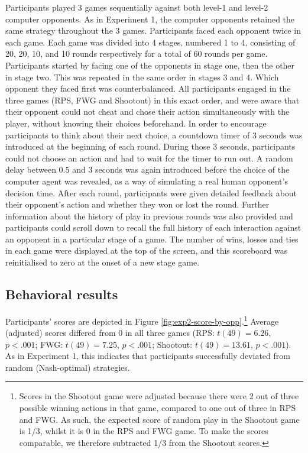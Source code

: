 \documentclass[smallextended]{svjour3}       %
\begin{document}
Participants played 3 games sequentially against both level-1 and
level-2 computer opponents. As in Experiment 1, the computer opponents
retained the same strategy throughout the 3 games. Participants faced
each opponent twice in each game. Each game was divided into 4 stages,
numbered 1 to 4, consisting of 20, 20, 10, and 10 rounds respectively
for a total of 60 rounds per game. Participants started by facing one of
the opponents in stage one, then the other in stage two. This was
repeated in the same order in stages 3 and 4. Which opponent they faced
first was counterbalanced. All participants engaged in the three games
(RPS, FWG and Shootout) in this exact order, and were aware that their
opponent could not cheat and chose their action simultaneously with the
player, without knowing their choices beforehand. In order to encourage
participants to think about their next choice, a countdown timer of 3
seconds was introduced at the beginning of each round. During those 3
seconds, participants could not choose an action and had to wait for the
timer to run out. A random delay between 0.5 and 3 seconds was again
introduced before the choice of the computer agent was revealed, as a
way of simulating a real human opponent's decision time. After each
round, participants were given detailed feedback about their opponent's
action and whether they won or lost the round. Further information about
the history of play in previous rounds was also provided and
participants could scroll down to recall the full history of each
interaction against an opponent in a particular stage of a game. The
number of wins, losses and ties in each game were displayed at the top
of the screen, and this scoreboard was reinitialised to zero at the
onset of a new stage game.

\hypertarget{behavioral-results-1}{%
\subsection{Behavioral results}\label{behavioral-results-1}}

Participants' scores are depicted in Figure
\ref{fig:exp2-score-by-opp}.\footnote{Scores in the Shootout game were
  adjusted because there were 2 out of three possible winning actions in
  that game, compared to one out of three in RPS and FWG. As such, the
  expected score of random play in the Shootout game is 1/3, whilst it
  is 0 in the RPS and FWG game. To make the scores comparable, we
  therefore subtracted 1/3 from the Shootout scores.} Average (adjusted)
scores differed from 0 in all three games (RPS: \(t(49) = 6.26\),
\(p < .001\); FWG: \(t(49) = 7.25\), \(p < .001\); Shootout:
\(t(49) = 13.61\), \(p < .001\)). As in Experiment 1, this indicates
that participants successfully deviated from random (Nash-optimal)
strategies.
\end{document}
